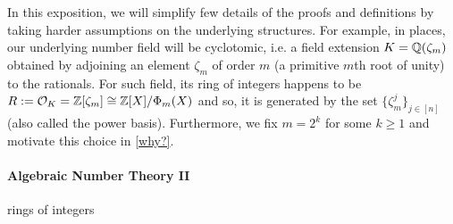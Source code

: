 In this exposition, we will simplify few details of the proofs and definitions by taking harder assumptions on the underlying structures. For example, in places, our underlying number field will be cyclotomic, i.e. a field extension $K=\mathbb{Q}(\zeta_m)$ obtained by adjoining an element $\zeta_m$ of order $m$ (a primitive $m$th root of unity) to the rationals. For such field, its ring of integers happens to be $R := \mathcal{O}_K = \mathbb{Z}[\zeta_m] \cong \mathbb{Z}[X]/\Phi_m(X)$ and so, it is generated by the set $\{\zeta_m^j\}_{j \in [n]}$ (also called the power basis). Furthermore, we fix $m = 2^k$ for some $k \geq 1$ and motivate this choice in \ref{why?}.

\paragraph{Algebraic Number Theory II}
\begin{definition}[Trace]
\end{definition}
\begin{definition}[Norm]
\end{definition}
rings of integers
\begin{definition}
\end{definition}
\begin{definition}
\end{definition}
\begin{definition}[Dual]
\end{definition}



